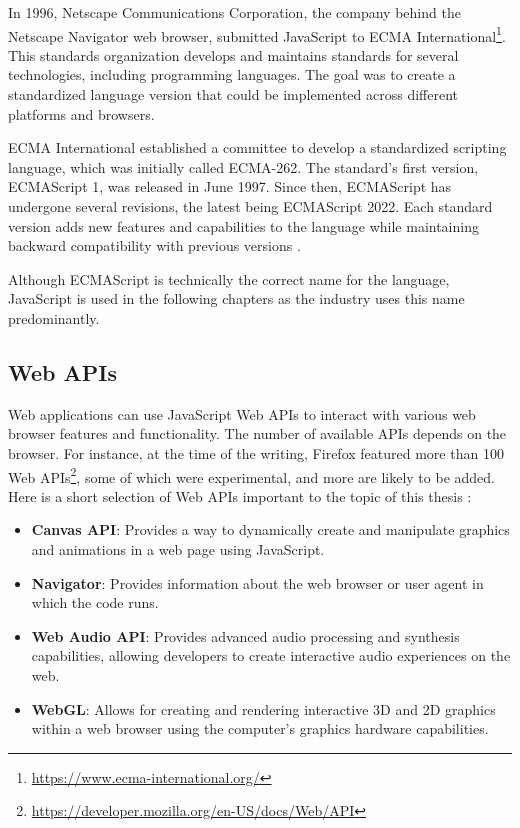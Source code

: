 In 1996, Netscape Communications Corporation, the company behind the Netscape Navigator web browser, submitted JavaScript to ECMA International\footnote{\url{https://www.ecma-international.org/}}. This standards organization develops and maintains standards for several technologies, including programming languages. The goal was to create a standardized language version that could be implemented across different platforms and browsers.

ECMA International established a committee to develop a standardized scripting language, which was initially called ECMA-262. The standard's first version, ECMAScript 1, was released in June 1997. Since then, ECMAScript has undergone several revisions, the latest being ECMAScript 2022. Each standard version adds new features and capabilities to the language while maintaining backward compatibility with previous versions \cite{JSDefinitiveGuide}.

Although ECMAScript is technically the correct name for the language, JavaScript is used in the following chapters as the industry uses this name predominantly.

\subsection{Web APIs}

Web applications can use JavaScript Web APIs to interact with various web browser features and functionality. The number of available APIs depends on the browser. For instance, at the time of the writing, Firefox featured more than 100 Web APIs\footnote{\url{https://developer.mozilla.org/en-US/docs/Web/API}}, some of which were experimental, and more are likely to be added. Here is a short selection of Web APIs important to the topic of this thesis \cite{SecurityWebDevs, SchauerDP}:

\begin{itemize}
	\item \textbf{Canvas API}: Provides a way to dynamically create and manipulate graphics and animations in a web page using JavaScript.
	\item \textbf{Navigator}: Provides information about the web browser or user agent in which the code runs.
	\item \textbf{Web Audio API}: Provides advanced audio processing and synthesis capabilities, allowing developers to create interactive audio experiences on the web.
	\item \textbf{WebGL}: Allows for creating and rendering interactive 3D and 2D graphics within a web browser using the computer's graphics hardware capabilities.
\end{itemize}

